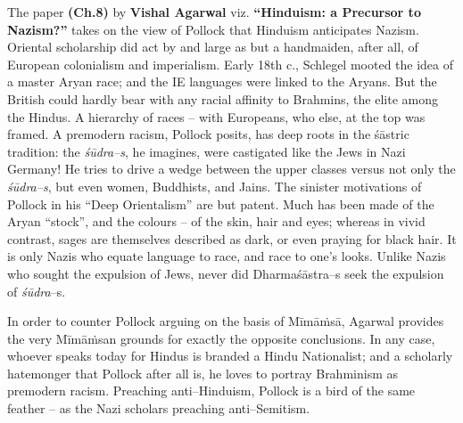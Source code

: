 The paper \textbf{(Ch.8)} by \textbf{Vishal Agarwal} viz. \textbf{“Hinduism: a Precursor to Nazism?”} takes on the view of Pollock that Hinduism anticipates Nazism. Oriental scholarship did act by and large as but a handmaiden, after all, of European colonialism and imperialism. Early 18th c., Schlegel mooted the idea of a master Aryan race; and the IE languages were linked to the Aryans. But the British could hardly bear with any racial affinity to Brahmins, the elite among the Hindus. A hierarchy of races – with Europeans, who else, at the top was framed. A premodern racism, Pollock posits, has deep roots in the śāstric tradition: the \textit{śūdra–s}, he imagines, were castigated like the Jews in Nazi Germany! He tries to drive a wedge between the upper classes versus not only the \textit{śūdra–s}, but even women, Buddhists, and Jains. The sinister motivations of Pollock in his “Deep Orientalism” are but patent. Much has been made of the Aryan “stock”, and the colours – of the skin, hair and eyes; whereas in vivid contrast, sages are themselves described as dark, or even praying for black hair. It is only Nazis who equate language to race, and race to one’s looks. Unlike Nazis who sought the expulsion of Jews, never did Dharmaśāstra–s seek the expulsion of \textit{śūdra}–s.

In order to counter Pollock arguing on the basis of Mīmāṁsā, Agarwal provides the very Mīmāṁsan grounds for exactly the opposite conclusions. In any case, whoever speaks today for Hindus is branded a Hindu Nationalist; and a scholarly hatemonger that Pollock after all is, he loves to portray Brahminism as premodern racism. Preaching anti–Hinduism, Pollock is a bird of the same feather – as the Nazi scholars preaching anti–Semitism.

